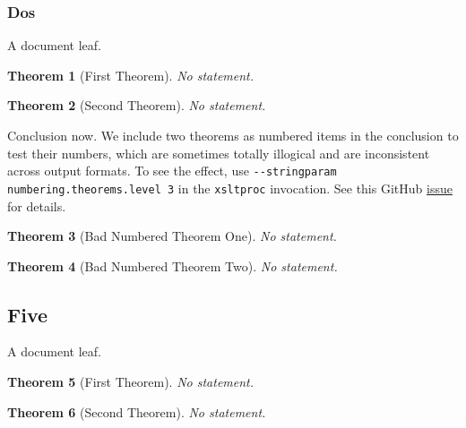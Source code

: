 \documentclass[10pt,]{article}
\theoremstyle{plain}
\newtheorem{theorem}{Theorem}[section]
\theoremstyle{definition}
\theoremstyle{definition}
\theoremstyle{definition}
\theoremstyle{definition}
\theoremstyle{definition}
\theoremstyle{definition}
\numberwithin{equation}{section}
\begin{document}
\subsubsection[{Dos}]{Dos}\label{subsubsection-9}
\hypertarget{p-778}{}%
A document leaf.%
\begin{theorem}[{First Theorem}]\label{theorem-number-11}
\hypertarget{p-779}{}%
No statement.%
\end{theorem}
\begin{theorem}[{Second Theorem}]\label{theorem-number-12}
\hypertarget{p-780}{}%
No statement.%
\end{theorem}
\bigbreak
\hypertarget{p-781}{}%
Conclusion now.  We include two theorems as numbered items in the conclusion to test their numbers, which are sometimes totally illogical and are inconsistent across output formats.  To see the effect, use \lstinline?--stringparam numbering.theorems.level 3? in the \lstinline?xsltproc? invocation. See this GitHub \href{https://github.com/rbeezer/mathbook/issues/139}{issue} for details.%
\begin{theorem}[{Bad Numbered Theorem One}]\label{theorem-bad-one}
\hypertarget{p-782}{}%
No statement.%
\end{theorem}
\begin{theorem}[{Bad Numbered Theorem Two}]\label{theorem-bad-two}
\hypertarget{p-783}{}%
No statement.%
\end{theorem}
\typeout{************************************************}
\typeout{************************************************}
\subsection[{Five}]{Five}\label{subsection-56}
\hypertarget{p-784}{}%
A document leaf.%
\begin{theorem}[{First Theorem}]\label{theorem-number-13}
\hypertarget{p-785}{}%
No statement.%
\end{theorem}
\begin{theorem}[{Second Theorem}]\label{theorem-number-14}
\hypertarget{p-786}{}%
No statement.%
\end{theorem}
\typeout{************************************************}
\typeout{************************************************}
\end{document}
